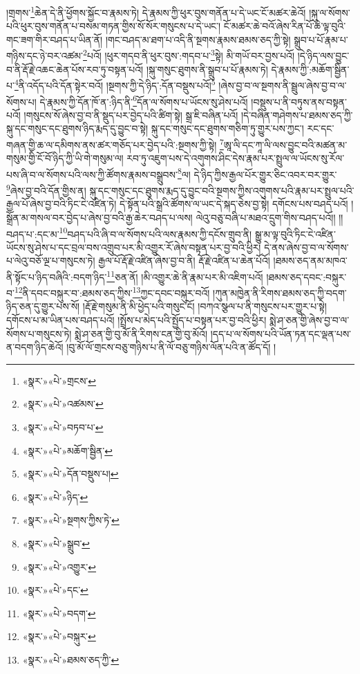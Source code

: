 །གྲགས་\footnote{«སྣར་»«པེ་»གྲངས་}ཆེན་དེ་ནི་ཕྱོགས་སྐྱོང་བ་རྣམས་ཏེ། དེ་རྣམས་ཀྱི་ཕུར་བུས་གནོན་པ་དེ་ཡང་ངོ་མཚར་ཆེའོ། །སྐུ་ལ་སོགས་པའི་ཕུར་བུས་གནོན་པ་བསམ་གཏན་གྱིས་སོ་སོར་གསུངས་པ་དེ་ཡང་། ངོ་མཚར་ཆེ་བའོ་ཞེས་རིན་པོ་ཆེ་ལྟ་བུའི་གང་ཟག་གིར་བཤད་པ་ཡིན་ནོ། །གང་བཤད་མ་ཐག་པ་འདི་ནི་སྔགས་རྣམས་ཐམས་ཅད་ཀྱི་སྟེ། སྒྲུབ་པ་པོ་རྣམ་པ་གཉིས་དང་ཉེ་བར་འཚམ་\footnote{«སྣར་»«པེ་»འཚམས་}པའོ། །ཕུར་གདབ་ནི་ཕུར་བུས་:གདབ་པ་\footnote{«སྣར་»«པེ་»བཏབ་པ་}སྟེ། མི་གཡོ་བར་བྱས་པའོ། །དེ་ཉིད་ལས་བྱུང་བ་ནི་རྡོ་རྗེ་འཆང་ཆེན་པོས་རབ་ཏུ་བསྟན་པའོ། །སྐུ་གསུང་ཐུགས་ནི་སྒྲུབ་པ་པོ་རྣམས་ཏེ། དེ་རྣམས་ཀྱི་:མཆོག་སྦྱིན་པ་\footnote{«སྣར་»«པེ་»མཆོག་སྦྱིན་}ནི་འདོད་པའི་དོན་སྟེར་བའོ། །སྔགས་ཀྱི་དེ་ཉིད་:དོན་བསྡུས་པའོ།\footnote{«སྣར་»«པེ་»དོན་བསྡུས་པ།} །ཞེས་བྱ་བ་ལ་སྔགས་ནི་སྦྲུལ་ཞེས་བྱ་བ་ལ་སོགས་པ། དེ་རྣམས་ཀྱི་དོན་ཁོ་ན་:ཉིད་ནི་\footnote{«སྣར་»«པེ་»ཉིད་}དོན་ལ་སོགས་པ་ཡོངས་སུ་ཤེས་པའོ། །བསྡུས་པ་ནི་བཏུས་ནས་བསྟན་པའོ། །གསུངས་སོ་ཞེས་བྱ་བ་ནི་སྡུད་པར་བྱེད་པའི་ཚིག་སྟེ། སྒྲ་ཇི་བཞིན་པའོ། །དེ་བཞིན་གཤེགས་པ་ཐམས་ཅད་ཀྱི་སྐུ་དང་གསུང་དང་ཐུགས་ཉིད་རྨད་དུ་བྱུང་བ་སྟེ། སྐུ་དང་གསུང་དང་ཐུགས་གཅིག་ཏུ་གྱུར་པས་ཀྱང་། རང་དང་གཞན་གྱི་ཆ་ལ་དམིགས་ནས་ཚར་གཅོད་པར་བྱེད་པའི་:སྔགས་ཀྱི་སྟེ། \footnote{«སྣར་»«པེ་»སྔགས་ཀྱིས་ཏེ་}ཨཱ་ལི་དང་ཀཱ་ལི་ལས་བྱུང་བའི་མཚན་མ་གསུམ་གྱི་ངོ་བོ་ཉིད་ཀྱི་ཡི་གེ་གསུམ་ལ། རབ་ཏུ་འཇུག་པས་དེ་འགུགས་ཤིང་དེས་རྣམ་པར་སྤྲུལ་ལ་ཡོངས་སུ་རོལ་པས་ཞི་བ་ལ་སོགས་པའི་ལས་ཀྱི་ཚོགས་རྣམས་བསྒྲུབས་\footnote{«སྣར་»«པེ་»སྒྲུབ་}ལ། དེ་ཉིད་ཀྱིས་རྒྱལ་པོར་གྱུར་ཅིང་འབར་བར་གྱུར་\footnote{«སྣར་»«པེ་»འགྱུར་}ཞེས་བྱ་བའི་དོན་གྱིས་ན། སྐུ་དང་གསུང་དང་ཐུགས་རྨད་དུ་བྱུང་བའི་སྔགས་ཀྱིས་འགུགས་པའི་རྣམ་པར་སྤྲུལ་པའི་རྒྱལ་པོ་ཞེས་བྱ་བའི་ཏིང་ངེ་འཛིན་ཏེ། དེ་སྟོན་པའི་སྒྲའི་ཚོགས་ལ་ཡང་དེ་སྐད་ཅེས་བྱ་སྟེ། དགོངས་པས་བཤད་པའོ། །སྒྲོན་མ་གསལ་བར་བྱེད་པ་ཞེས་བྱ་བའི་རྒྱ་ཆེར་བཤད་པ་ལས། ལེའུ་བཅུ་བཞི་པ་མཐའ་དྲུག་གིས་བཤད་པའོ།། །།བཤད་པ་:དང་མ་\footnote{«སྣར་»«པེ་»དང་}བཤད་པའི་ཞི་བ་ལ་སོགས་པའི་ལས་རྣམས་ཀྱི་དངོས་གྲུབ་ནི། སྒྱུ་མ་ལྟ་བུའི་ཏིང་ངེ་འཛིན་ཡོངས་སུ་ཤེས་པ་དང་བྲལ་བས་འགྲུབ་པར་མི་འགྱུར་རོ་ཞེས་བསྟན་པར་བྱ་བའི་ཕྱིར། དེ་ནས་ཞེས་བྱ་བ་ལ་སོགས་པ་ལེའུ་བཅོ་ལྔ་པ་གསུངས་ཏེ། རྒྱལ་པོ་རྡོ་རྗེ་འཛིན་ཞེས་བྱ་བ་ནི། རྡོ་རྗེ་འཛིན་པ་ཆེན་པོའོ། །ཐམས་ཅད་ནམ་མཁའ་ནི་སྟོང་པ་ཉིད་བཞིའི་:བདག་ཉིད་\footnote{«སྣར་»«པེ་»བདག་}ཅན་ནོ། །མི་འགྱུར་ཆེ་ནི་རྣམ་པར་མི་འཇིག་པའོ། །ཐམས་ཅད་དབང་:བསྐུར་བ་\footnote{«སྣར་»«པེ་»བསྐུར་}ནི་དབང་བསྐུར་བ་:ཐམས་ཅད་ཀྱིས་\footnote{«སྣར་»«པེ་»ཐམས་ཅད་ཀྱི་}ཀྱང་དབང་བསྐུར་བའོ། །ཀུན་མཁྱེན་ནི་རིགས་ཐམས་ཅད་ཀྱི་བདག་ཉིད་ཅན་དུ་གྱུར་པས་སོ། །རྡོ་རྗེ་གསུམ་ནི་མི་ཕྱེད་པའི་གསུང་ངོ། །བཀའ་སྩལ་པ་ནི་གསུངས་པར་གྱུར་པ་སྟེ། དགོངས་པ་མ་ཡིན་པས་བཤད་པའོ། །སྤྲོས་པ་མེད་པའི་སྤྱོད་པ་བསྟན་པར་བྱ་བའི་ཕྱིར། སྨེ་ཤ་ཅན་གྱི་ཞེས་བྱ་བ་ལ་སོགས་པ་གསུངས་ཏེ། སྨེ་ཤ་ཅན་གྱི་བུ་མོ་ནི་རིགས་ངན་གྱི་བུ་མོའོ། །དད་པ་ལ་སོགས་པའི་ཡོན་ཏན་དང་ལྡན་པས་ན་བདག་ཉིད་ཆེའོ། །བུ་མོ་ལོ་གྲངས་བཅུ་གཉིས་པ་ནི་ལོ་བཅུ་གཉིས་ལོན་པའི་ན་ཚོད་དོ། །
